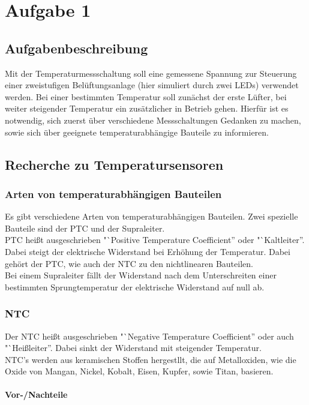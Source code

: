 \section{Aufgabe 1}

\subsection{Aufgabenbeschreibung}

Mit der Temperaturmessschaltung soll eine gemessene Spannung zur Steuerung einer zweistufigen Belüftungsanlage (hier simuliert durch zwei LEDs) verwendet werden. Bei einer bestimmten Temperatur soll zunächst der erste Lüfter, bei weiter steigender Temperatur ein zusätzlicher in Betrieb gehen. Hierfür ist es notwendig, sich zuerst über verschiedene Messschaltungen Gedanken zu machen, sowie sich über geeignete temperaturabhängige Bauteile zu informieren.

\subsection{Recherche zu Temperatursensoren}
\subsubsection{Arten von temperaturabhängigen Bauteilen}
Es gibt verschiedene Arten von temperaturabhängigen Bauteilen. Zwei spezielle Bauteile sind der PTC und der Supraleiter.\\
PTC heißt ausgeschrieben "`Positive Temperature Coefficient'' oder "`Kaltleiter''. Dabei steigt der elektrische Widerstand bei Erhöhung der Temperatur. Dabei gehört der PTC, wie auch der NTC zu den nichtlinearen Bauteilen.\\
Bei einem Supraleiter fällt der Widerstand nach dem Unterschreiten einer bestimmten Sprungtemperatur der elektrische Widerstand auf null ab.
\subsubsection{NTC}
Der NTC heißt ausgeschrieben "`Negative Temperature Coefficient'' oder auch "`Heißleiter''. Dabei sinkt der Widerstand mit steigender Temperatur.\\
NTC's werden aus keramischen Stoffen hergestllt, die auf Metalloxiden, wie die Oxide von Mangan, Nickel, Kobalt, Eisen, Kupfer, sowie Titan, basieren.

\paragraph{Vor-/Nachteile}

